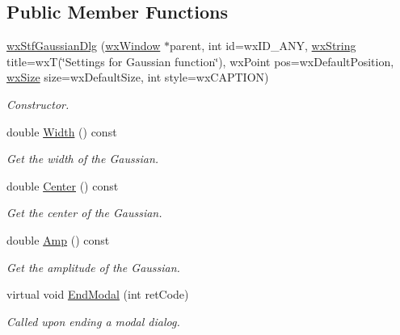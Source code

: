 \subsection*{Public Member Functions}
\begin{DoxyCompactItemize}
\item 
\hyperlink{classwxStfGaussianDlg_a0c21a17835300888f0808ba3012e9516}{wxStfGaussianDlg} (\hyperlink{classwxWindow}{wxWindow} $\ast$parent, int id=wxID\_\-ANY, \hyperlink{classwxString}{wxString} title=wxT(\char`\"{}Settings for Gaussian function\char`\"{}), wxPoint pos=wxDefaultPosition, \hyperlink{classwxSize}{wxSize} size=wxDefaultSize, int style=wxCAPTION)
\begin{DoxyCompactList}\small\item\em Constructor. \item\end{DoxyCompactList}\item 
double \hyperlink{classwxStfGaussianDlg_aa35effdf9697f4795f047592af846894}{Width} () const 
\begin{DoxyCompactList}\small\item\em Get the width of the Gaussian. \item\end{DoxyCompactList}\item 
double \hyperlink{classwxStfGaussianDlg_aaead7f642a373594316867193038525b}{Center} () const 
\begin{DoxyCompactList}\small\item\em Get the center of the Gaussian. \item\end{DoxyCompactList}\item 
double \hyperlink{classwxStfGaussianDlg_abfffa79e6088609f367531a267ff9bde}{Amp} () const 
\begin{DoxyCompactList}\small\item\em Get the amplitude of the Gaussian. \item\end{DoxyCompactList}\item 
virtual void \hyperlink{classwxStfGaussianDlg_af51cef0ee1cd2eb515c7bee24b2a5468}{EndModal} (int retCode)
\begin{DoxyCompactList}\small\item\em Called upon ending a modal dialog. \item\end{DoxyCompactList}\end{DoxyCompactItemize}


